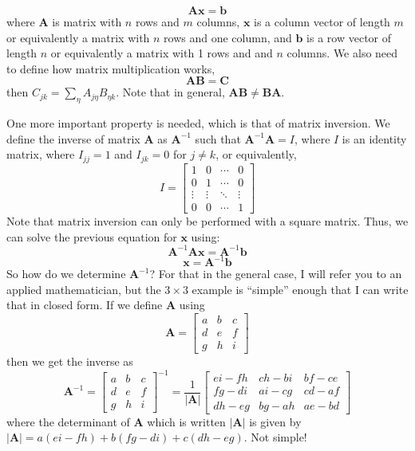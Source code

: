 $$\mathbf{A} \mathbf{x} = \mathbf{b}$$
where $\mathbf{A}$ is matrix with $n$ rows and $m$ columns,  $\mathbf{x}$ is a column vector of length $m$ or equivalently a matrix with $n$ rows and one column, and $\mathbf{b}$ is a row vector of length $n$ or equivalently a matrix with 1 rows and and $n$ columns. We also need to define how matrix multiplication works, 
$$\mathbf{A} \mathbf{B} = \mathbf{C}$$
then $C_{jk} = \sum_\eta A_{j\eta} B_{\eta k}$. Note that in general, $\mathbf{A} \mathbf{B} \neq \mathbf{B} \mathbf{A}$. 

One more important property is needed, which is that of matrix inversion. We define the inverse of matrix $\mathbf{A}$ as $\mathbf{A}^{-1}$ such that $\mathbf{A}^{-1} \mathbf{A} = I$, where $I$ is an identity matrix, where $I_{jj} = 1$ and $I_{jk} = 0$ for $j \neq k$, or equivalently,
$$
I = 
\begin{bmatrix}
1 & 0 & \cdots & 0 \\
0 & 1 & \cdots & 0 \\
\vdots & \vdots & \ddots & \vdots \\
0 & 0 & \cdots & 1
\end{bmatrix}
$$
Note that matrix inversion can only be performed with a square matrix. Thus, we can solve the previous equation for $\mathbf{x}$ using:
$$\mathbf{A}^{-1} \mathbf{A} \mathbf{x} = \mathbf{A}^{-1} \mathbf{b}$$
$$\mathbf{x} = \mathbf{A}^{-1} \mathbf{b}$$
So how do we determine $\mathbf{A}^{-1}$? For that in the general case, I will refer you to an applied mathematician, but the $3\times 3$ example is ``simple'' enough that I can write that in closed form. If we define $\mathbf{A}$ using
$$
\mathbf{A} = 
\begin{bmatrix}
a & b & c \\
d & e & f \\
g & h & i
\end{bmatrix}
$$
then we get the inverse as 
$$\mathbf{A}^{-1} = 
\begin{bmatrix}
a & b & c \\
d & e & f \\
g & h & i
\end{bmatrix}^{-1} = 
\frac{1}{|\textbf{A}|}
\begin{bmatrix}
ei-fh & ch-bi & bf-ce \\
fg -di& ai-cg & cd-af \\
dh-eg & bg-ah & ae-bd
\end{bmatrix}
$$
where the determinant of  $\textbf{A}$ which is written $|\textbf{A}|$ is given by $|\textbf{A}| = a(ei-fh) + b(fg -di) + c(dh-eg)$. Not simple! 

